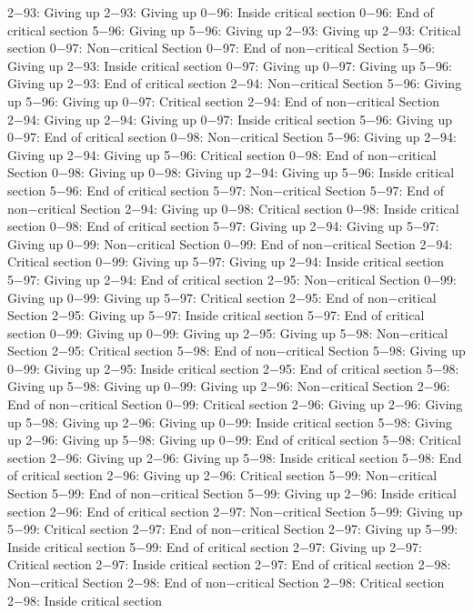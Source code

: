 2−93: Giving up
2−93: Giving up
0−96: Inside critical section
0−96: End of critical section
5−96: Giving up
5−96: Giving up
2−93: Giving up
2−93: Critical section
0−97: Non−critical Section
0−97: End of non−critical Section
5−96: Giving up
2−93: Inside critical section
0−97: Giving up
0−97: Giving up
5−96: Giving up
2−93: End of critical section
2−94: Non−critical Section
5−96: Giving up
5−96: Giving up
0−97: Critical section
2−94: End of non−critical Section
2−94: Giving up
2−94: Giving up
0−97: Inside critical section
5−96: Giving up
0−97: End of critical section
0−98: Non−critical Section
5−96: Giving up
2−94: Giving up
2−94: Giving up
5−96: Critical section
0−98: End of non−critical Section
0−98: Giving up
0−98: Giving up
2−94: Giving up
5−96: Inside critical section
5−96: End of critical section
5−97: Non−critical Section
5−97: End of non−critical Section
2−94: Giving up
0−98: Critical section
0−98: Inside critical section
0−98: End of critical section
5−97: Giving up
2−94: Giving up
5−97: Giving up
0−99: Non−critical Section
0−99: End of non−critical Section
2−94: Critical section
0−99: Giving up
5−97: Giving up
2−94: Inside critical section
5−97: Giving up
2−94: End of critical section
2−95: Non−critical Section
0−99: Giving up
0−99: Giving up
5−97: Critical section
2−95: End of non−critical Section
2−95: Giving up
5−97: Inside critical section
5−97: End of critical section
0−99: Giving up
0−99: Giving up
2−95: Giving up
5−98: Non−critical Section
2−95: Critical section
5−98: End of non−critical Section
5−98: Giving up
0−99: Giving up
2−95: Inside critical section
2−95: End of critical section
5−98: Giving up
5−98: Giving up
0−99: Giving up
2−96: Non−critical Section
2−96: End of non−critical Section
0−99: Critical section
2−96: Giving up
2−96: Giving up
5−98: Giving up
2−96: Giving up
0−99: Inside critical section
5−98: Giving up
2−96: Giving up
5−98: Giving up
0−99: End of critical section
5−98: Critical section
2−96: Giving up
2−96: Giving up
5−98: Inside critical section
5−98: End of critical section
2−96: Giving up
2−96: Critical section
5−99: Non−critical Section
5−99: End of non−critical Section
5−99: Giving up
2−96: Inside critical section
2−96: End of critical section
2−97: Non−critical Section
5−99: Giving up
5−99: Critical section
2−97: End of non−critical Section
2−97: Giving up
5−99: Inside critical section
5−99: End of critical section
2−97: Giving up
2−97: Critical section
2−97: Inside critical section
2−97: End of critical section
2−98: Non−critical Section
2−98: End of non−critical Section
2−98: Critical section
2−98: Inside critical section
